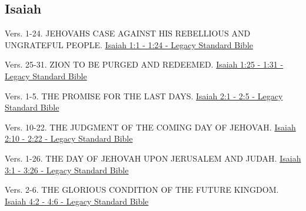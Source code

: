 \documentclass[
  ignorenonframetext,
]{beamer}
\begin{document}
\subsection{Isaiah}\label{isaiah}

\begin{frame}{1}
\label{section-32}
\begin{block}{Vers. 1-24. JEHOVAH\textquotesingle S CASE AGAINST HIS
REBELLIOUS AND UNGRATEFUL PEOPLE.}
\label{vers.-1-24.-jehovahs-case-against-his-rebellious-and-ungrateful-people.}
\href{https://read.lsbible.org/?q=is1\%3A1-24}{Isaiah 1:1 - 1:24 -
Legacy Standard Bible}
\end{block}

\begin{block}{Vers. 25-31. ZION TO BE PURGED AND REDEEMED.}
\label{vers.-25-31.-zion-to-be-purged-and-redeemed.}
\href{https://read.lsbible.org/?q=is1\%3A25-31}{Isaiah 1:25 - 1:31 -
Legacy Standard Bible}
\end{block}
\end{frame}

\begin{frame}{2}
\label{section-33}
\begin{block}{Vers. 1-5. THE PROMISE FOR THE LAST DAYS.}
\label{vers.-1-5.-the-promise-for-the-last-days.}
\href{https://read.lsbible.org/?q=is2\%3A1-5}{Isaiah 2:1 - 2:5 - Legacy
Standard Bible}
\end{block}

\begin{block}{Vers. 10-22. THE JUDGMENT OF THE COMING DAY OF JEHOVAH.}
\label{vers.-10-22.-the-judgment-of-the-coming-day-of-jehovah.}
\href{https://read.lsbible.org/?q=is2\%3A10-22}{Isaiah 2:10 - 2:22 -
Legacy Standard Bible}
\end{block}
\end{frame}

\begin{frame}{3}
\label{section-34}
\begin{block}{Vers. 1-26. THE DAY OF JEHOVAH UPON JERUSALEM AND JUDAH.}
\label{vers.-1-26.-the-day-of-jehovah-upon-jerusalem-and-judah.}
\href{https://read.lsbible.org/?q=is3\%3A1-26}{Isaiah 3:1 - 3:26 -
Legacy Standard Bible}
\end{block}
\end{frame}

\begin{frame}{4}
\label{section-35}
\begin{block}{Vers. 2-6. THE GLORIOUS CONDITION OF THE FUTURE KINGDOM.}
\label{vers.-2-6.-the-glorious-condition-of-the-future-kingdom.}
\href{https://read.lsbible.org/?q=is4\%3A2-6}{Isaiah 4:2 - 4:6 - Legacy
Standard Bible}
\end{block}
\end{frame}
\end{document}
